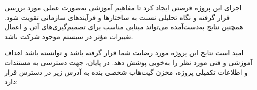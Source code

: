 \documentclass[12pt,a4paper]{report}
\begin{document}
اجرای این پروژه فرصتی ایجاد کرد تا مفاهیم آموزشی به‌صورت عملی مورد بررسی قرار گرفته و نگاه تحلیلی نسبت به ساختارها و فرآیندهای سازمانی تقویت شود. همچنین نتایج به‌دست‌آمده می‌تواند مبنایی مناسب برای تصمیم‌گیری‌های آتی و اعمال تغییرات مؤثر در سیستم موجود شرکت باشد.

امید است نتایج این پروژه مورد رضایت شما قرار گرفته باشد و توانسته باشد اهداف آموزشی و فنی مورد نظر را به‌خوبی پوشش دهد. در پایان، جهت دسترسی به مستندات و اطلاعات تکمیلی پروژه، مخزن گیت‌هاب شخصی بنده به آدرس زیر در دسترس قرار دارد:
\begin{center}
\end{center}
\end{document}
